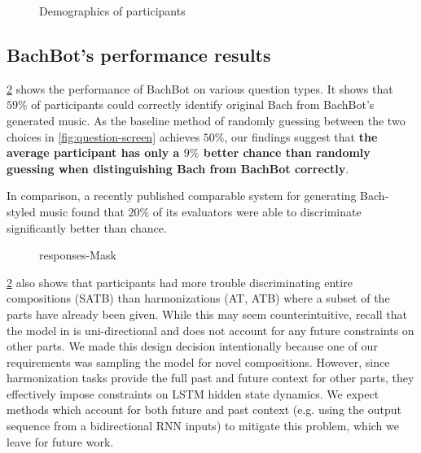\begin{figure}[tb]
  \centering
  
  \caption{Demographics of participants}
  \label{fig:user-demographics}
\end{figure}

\subsection{BachBot's performance results}



\cref{fig:responses-mask} shows the performance of BachBot on various question
types. It shows that $59\%$ of participants could correctly
identify original Bach from BachBot's generated music. As the baseline method
of randomly guessing between the two choices in \cref{fig:question-screen}
achieves $50\%$, our findings suggest that {\bf the average participant has only a
$9\%$ better chance than randomly guessing when
distinguishing Bach from BachBot correctly}.

 In comparison, a recently
published comparable system for generating Bach-styled music found that
$20\%$ of its evaluators were able to discriminate significantly better than chance.

\begin{figure}[tb]
  \centering
  
  \caption{responses-Mask}
  \label{fig:responses-mask}
\end{figure}

\cref{fig:responses-mask} also shows that participants had more trouble
discriminating entire compositions (SATB) than harmonizations (AT, ATB) where a
subset of the parts have already been given. While this may seem
counterintuitive, recall that the model in  is uni-directional
and does not account for any future constraints on other parts. We made
this design decision intentionally because one of our requirements was sampling
the model for novel compositions. However, since harmonization tasks provide
the full past and future context for other parts, they effectively impose constraints
on LSTM hidden state dynamics. We expect methods which account for both future and past
context (e.g. using the output sequence from a bidirectional RNN inputs)
to mitigate this problem, which we leave for future work.

